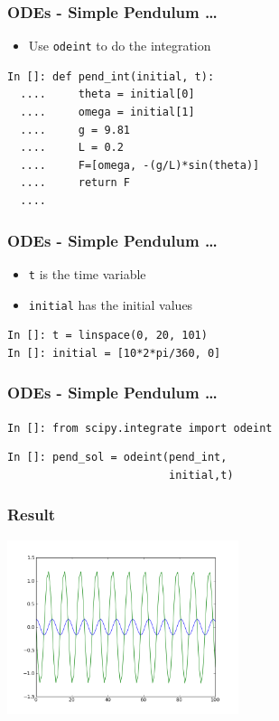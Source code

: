 \documentclass[14pt,compress]{beamer}
\newcounter{time}
\newcommand{\inctime}[1]{\addtocounter{time}{#1}{\tiny \thetime\ m}}
\newcommand{\typ}[1]{\lstinline{#1}}
\begin{document}
\begin{frame}[fragile]
\frametitle{ODEs - Simple Pendulum \ldots}
\begin{itemize}
\item Use \typ{odeint} to do the integration
\end{itemize}
\begin{lstlisting}
In []: def pend_int(initial, t):
  ....     theta = initial[0]
  ....     omega = initial[1]
  ....     g = 9.81
  ....     L = 0.2
  ....     F=[omega, -(g/L)*sin(theta)]
  ....     return F
  ....
\end{lstlisting}
\end{frame}

\begin{frame}[fragile]
\frametitle{ODEs - Simple Pendulum \ldots}
\begin{itemize}
\item \typ{t} is the time variable \\
\item \typ{initial} has the initial values
\end{itemize}
\begin{lstlisting}
In []: t = linspace(0, 20, 101)
In []: initial = [10*2*pi/360, 0]
\end{lstlisting}
\end{frame}

\begin{frame}[fragile]
\frametitle{ODEs - Simple Pendulum \ldots}
\typ{In []: from scipy.integrate import odeint}
\begin{lstlisting}
In []: pend_sol = odeint(pend_int,
                         initial,t)
\end{lstlisting}
\end{frame}

\begin{frame}[fragile]
\frametitle{Result}
\begin{center}
\includegraphics[height=2in, interpolate=true]{data/ode}
\end{center}
  \inctime{10}
\end{frame}
\end{document}
